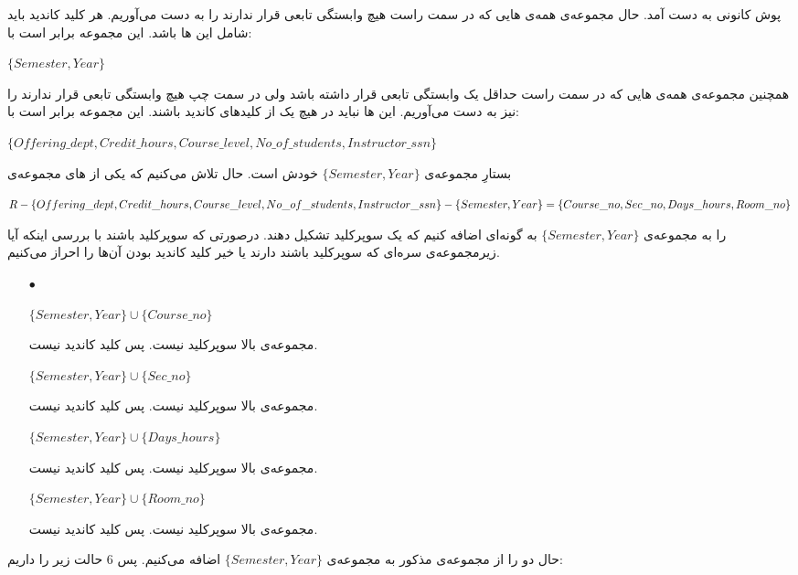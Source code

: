 \documentclass{article}
\begin{document}
پوش کانونی به دست آمد. حال مجموعه‌ی همه‌ی هایی که در سمت راست هیچ وابستگی تابعی قرار ندارند را به دست می‌آوریم. هر کلید کاندید باید شامل این ها باشد. این مجموعه برابر است با:
\begin{latin}
$
\{Semester, Year\}
$
\end{latin}
همچنین مجموعه‌ی همه‌ی هایی که در سمت راست حداقل یک وابستگی تابعی قرار داشته باشد ولی در سمت چپ هیچ وابستگی تابعی قرار ندارند را نیز به دست می‌آوریم. این ها نباید در هیچ یک از کلیدهای کاندید باشند. این مجموعه برابر است با:
\begin{latin}
$
\{Offering\_dept, Credit\_hours, Course\_level, No\_of\_students, Instructor\_ssn\}
$
\end{latin}
بستارِ مجموعه‌ی 
$
\{Semester, Year\}
$
خودش است.
حال تلاش می‌کنیم که یکی از های مجموعه‌ی
\begin{latin}
$
R-\{Offering\_dept, Credit\_hours, Course\_level, No\_of\_students, Instructor\_ssn\}-\{Semester, Year\}\\
=\{Course\_no, Sec\_no, Days\_hours, Room\_no\}
$
\end{latin}
را به مجموعه‌ی
$
\{Semester, Year\}
$
به گونه‌ای اضافه کنیم که یک سوپرکلید تشکیل دهند. درصورتی که سوپرکلید باشند با بررسی اینکه آیا زیرمجموعه‌ی سره‌ای که سوپرکلید باشند دارند یا خیر کلید کاندید بودن آن‌ها را احراز می‌کنیم.
\begin{itemize}
    \item [$\bullet$]
\begin{latin}
$
\{Semester, Year\}\cup\{Course\_no\}
$
\end{latin}
مجموعه‌ی بالا سوپرکلید نیست. پس کلید کاندید نیست.

\begin{latin}
$
\{Semester, Year\}\cup\{Sec\_no\}
$
\end{latin}
مجموعه‌ی بالا سوپرکلید نیست. پس کلید کاندید نیست.

\begin{latin}
$
\{Semester, Year\}\cup\{Days\_hours\}
$
\end{latin}
مجموعه‌ی بالا سوپرکلید نیست. پس کلید کاندید نیست.

\begin{latin}
$
\{Semester, Year\}\cup\{Room\_no\}
$
\end{latin}
مجموعه‌ی بالا سوپرکلید نیست. پس کلید کاندید نیست.
\end{itemize}
حال دو  را از مجموعه‌ی مذکور به 
مجموعه‌ی
$
\{Semester, Year\}
$
اضافه می‌کنیم. پس 6 حالت زیر را داریم:
\end{document}
